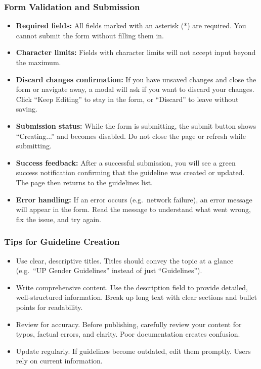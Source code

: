 \documentclass[12pt, a4paper]{article}
\begin{document}
\subsubsection{Form Validation and Submission}

\begin{itemize}
  \item \textbf{Required fields:} All fields marked with an asterisk (*) are required. You cannot submit the form without filling them in.
  \item \textbf{Character limits:} Fields with character limits will not accept input beyond the maximum.
  \item \textbf{Discard changes confirmation:} If you have unsaved changes and close the form or navigate away, a modal will ask if you want to discard your changes. Click ``Keep Editing'' to stay in the form, or ``Discard'' to leave without saving.
  \item \textbf{Submission status:} While the form is submitting, the submit button shows ``Creating...'' and becomes disabled. Do not close the page or refresh while submitting.
  \item \textbf{Success feedback:} After a successful submission, you will see a green success notification confirming that the guideline was created or updated. The page then returns to the guidelines list.
  \item \textbf{Error handling:} If an error occurs (e.g.\ network failure), an error message will appear in the form. Read the message to understand what went wrong, fix the issue, and try again.
\end{itemize}

\subsubsection{Tips for Guideline Creation}

\begin{itemize}[leftmargin=1.5em]
  \item Use clear, descriptive titles. Titles should convey the topic at a glance (e.g.\ ``UP Gender Guidelines'' instead of just ``Guidelines'').
  \item Write comprehensive content. Use the description field to provide detailed, well-structured information. Break up long text with clear sections and bullet points for readability.
  \item Review for accuracy. Before publishing, carefully review your content for typos, factual errors, and clarity. Poor documentation creates confusion.
  \item Update regularly. If guidelines become outdated, edit them promptly. Users rely on current information.
\end{itemize}
\end{document}
